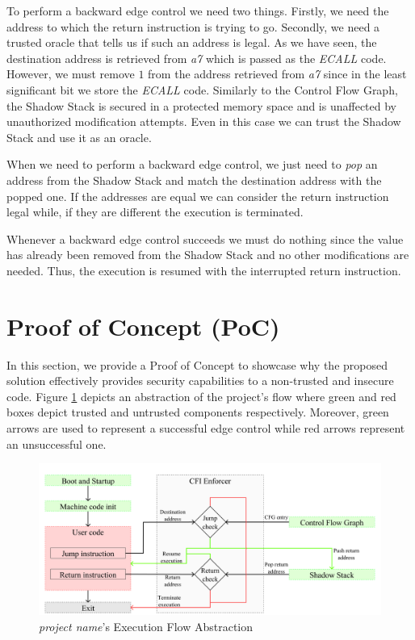 To perform a backward edge control we need two things. Firstly, we need the address
to which the return instruction is trying to go. Secondly, we need a trusted oracle
that tells us if such an address is legal. As we have seen, the destination address
is retrieved from \textit{a7} which is passed as the \textit{ECALL} code.
However, we must remove $1$ from the address retrieved from \textit{a7} since in
the least significant bit we store the \textit{ECALL} code. Similarly to the
Control Flow Graph, the Shadow Stack is secured in a protected memory space and is
unaffected by unauthorized modification attempts. Even in this case we can trust
the Shadow Stack and use it as an oracle.

When we need to perform a backward edge control, we just need to \textit{pop} an
address from the Shadow Stack and match the destination address with the popped
one. If the addresses are equal we can consider the return instruction legal while,
if they are different the execution is terminated.

Whenever a backward edge control succeeds we must do nothing since the value has
already been removed from the Shadow Stack and no other modifications are needed.
Thus, the execution is resumed with the interrupted return instruction.

\section{Proof of Concept (PoC)}
\label{sec:project_poc}

In this section, we provide a Proof of Concept to showcase why the proposed
solution effectively provides security capabilities to a non-trusted and
insecure code. Figure \ref{fig:functioning} depicts an abstraction of the project's
flow where green and red boxes depict trusted and untrusted components respectively.
Moreover, green arrows are used to represent a successful edge control while red
arrows represent an unsuccessful one.

\begin{figure}[htbp]
  \centering
  \includegraphics[width=.9\linewidth]{images/functioning.png}
  \caption{\textit{project name}'s Execution Flow Abstraction}
  \label{fig:functioning}
\end{figure}

